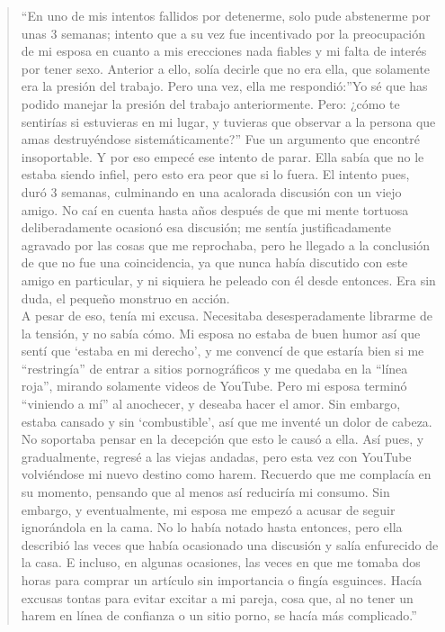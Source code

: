\documentclass[
  openany]{book}
\begin{document}
\begin{quote}
``En uno de mis intentos fallidos por detenerme, solo pude abstenerme por unas 3 semanas; intento que a su vez fue incentivado por la preocupación de mi esposa en cuanto a mis erecciones nada fiables y mi falta de interés por tener sexo. Anterior a ello, solía decirle que no era ella, que solamente era la presión del trabajo. Pero una vez, ella me respondió:''Yo sé que has podido manejar la presión del trabajo anteriormente. Pero: ¿cómo te sentirías si estuvieras en mi lugar, y tuvieras que observar a la persona que amas destruyéndose sistemáticamente?'' Fue un argumento que encontré insoportable. Y por eso empecé ese intento de parar. Ella sabía que no le estaba siendo infiel, pero esto era peor que si lo fuera. El intento pues, duró 3 semanas, culminando en una acalorada discusión con un viejo amigo. No caí en cuenta hasta años después de que mi mente tortuosa deliberadamente ocasionó esa discusión; me sentía justificadamente agravado por las cosas que me reprochaba, pero he llegado a la conclusión de que no fue una coincidencia, ya que nunca había discutido con este amigo en particular, y ni siquiera he peleado con él desde entonces. Era sin duda, el pequeño monstruo en acción.\\
A pesar de eso, tenía mi excusa. Necesitaba desesperadamente librarme de la tensión, y no sabía cómo. Mi esposa no estaba de buen humor así que sentí que `estaba en mi derecho', y me convencí de que estaría bien si me ``restringía'' de entrar a sitios pornográficos y me quedaba en la ``línea roja'', mirando solamente videos de YouTube. Pero mi esposa terminó ``viniendo a mí'' al anochecer, y deseaba hacer el amor. Sin embargo, estaba cansado y sin `combustible', así que me inventé un dolor de cabeza. No soportaba pensar en la decepción que esto le causó a ella. Así pues, y gradualmente, regresé a las viejas andadas, pero esta vez con YouTube volviéndose mi nuevo destino como harem. Recuerdo que me complacía en su momento, pensando que al menos así reduciría mi consumo. Sin embargo, y eventualmente, mi esposa me empezó a acusar de seguir ignorándola en la cama. No lo había notado hasta entonces, pero ella describió las veces que había ocasionado una discusión y salía enfurecido de la casa. E incluso, en algunas ocasiones, las veces en que me tomaba dos horas para comprar un artículo sin importancia o fingía esguinces. Hacía excusas tontas para evitar excitar a mi pareja, cosa que, al no tener un harem en línea de confianza o un sitio porno, se hacía más complicado.''
\end{quote}
\end{document}
